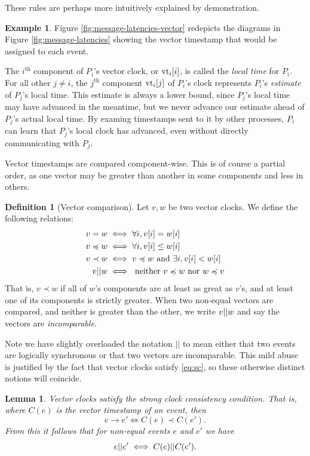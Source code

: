 \documentclass[]             %
{NASA}                       %
\newtheorem{lemma}[theorem]{Lemma}
\theoremstyle{definition}
\newtheorem{example}{Example}[section]
\newtheorem{definition}{Definition}[section]
\begin{document}
These rules are perhaps more intuitively explained by demonstration.

\begin{example}
Figure \ref{fig:message-latencies-vector} redepicts the diagrams in
Figure \ref{fig:message-latencies} showing the vector timestamp that
would be assigned to each event.
\end{example}

The $i^\textrm{th}$ component of $P_i$'s vector clock, or $\textrm{vt}_i[i]$,
is called the \emph{local time} for $P_i$. For all other $j \neq i$,
the $j^\textrm{th}$ component $\textrm{vt}_i[j]$ of $P_i$'s clock represents
$P_i$'s \emph{estimate} of $P_j$'s local time. This estimate is always
a lower bound, since $P_j$'s local time may have advanced in the
meantime, but we never advance our estimate ahead of $P_j$'s actual
local time. By examing timestamps sent to it by other processes, $P_i$
can learn that $P_j$'s local clock has advanced, even without directly
communicating with $P_j$.

Vector timestamps are compared component-wise. This is of course a
partial order, as one vector may be greater than another in some
components and less in others.
\begin{definition}[Vector comparison]
  Let $v, w$ be two vector clocks. We define the following relations:
  \begin{align*}
             v = w &\iff \forall i, v[i] = w[i] \\
  v \preccurlyeq w &\iff \forall i, v[i] \leq w[i] \\
         v \prec w &\iff v \preccurlyeq w \textrm{ and } \exists i, v[i] < w[i] \\
            v || w &\iff \textrm{ neither } v \preccurlyeq w \textrm{ nor } w \preccurlyeq v
  \end{align*}
  That is, $v \prec w$ if all of $w$'s components are at least as
  great as $v$'s, and at least one of its components is strictly
  greater. When two non-equal vectors are compared, and neither is
  greater than the other, we write $v || w$ and say the vectors
  are \emph{incomparable}.
\end{definition}

Note we have slightly overloaded the notation $||$ to mean either that
two events are logically synchronous or that two vectors are
incomparable. This mild abuse is justified by the fact that vector
clocks satisfy \ref{eq:sc}, so these otherwise distinct notions will
coincide.
\begin{lemma}
  Vector clocks satisfy the strong clock consistency condition. That
  is, where $C(e)$ is the vector timestamp of an event, then
  \[ e \to e' \iff C(e) \prec C(e'). \]
  From this it follows that for non-equal events $e$ and $e'$ we have
  \[ e || e' \iff C(e) || C(e'). \]
\end{lemma}
\end{document}
